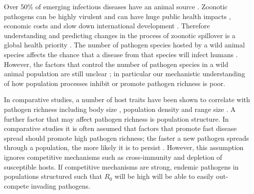 
Over 50\% of emerging infectious diseases have an animal source \cite{jones2008global, smith2014global}.
Zoonotic pathogens can be highly virulent \cite{luby2009recurrent, lefebvre2014case} and can have huge public health impacts \cite{granich2015trends}, economic costs \cite{knobler2004learning} and slow down international development \cite{ebolaWorldbank}.
Therefore understanding and predicting changes in the process of zoonotic spillover is a global health priority \cite{taylor2001risk}.
The number of pathogen species hosted by a wild animal species affects the chance that a disease from that species will infect humans \cite{wolfe2000deforestation}.
However, the factors that control the number of pathogen species in a wild animal population are still unclear \cite{metcalf2015five}; in particular our mechanistic understanding of how population processes inhibit or promote pathogen richness is poor.







In comparative studies, a number of host traits have been shown to correlate with pathogen richness including body size \cite{kamiya2014determines, arneberg2002host}, population density \cite{nunn2003comparative, arneberg2002host} and range size \cite{bordes2011impact, kamiya2014determines}.
A further factor that may affect pathogen richness is population structure.
In comparative studies it is often assumed that factors that promote fast disease spread should promote high pathogen richness; the faster a new pathogen spreads through a population, the more likely it is to persist \cite{nunn2003comparative, morand2000wormy, poulin2014parasite, poulin2000diversity, altizer2003social}.
However, this assumption ignores competitive mechanisms such as cross-immunity and depletion of susceptible hosts.
If competitive mechanisms are strong, endemic pathogens in populations structured such that $R_0$ will be high will be able to easily out-compete invading pathogens.

